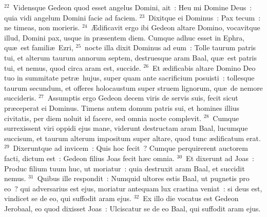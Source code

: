 ${}^{22}$~Vidensque Gedeon quod esset angelus Domini, ait~: Heu mi Domine Deus~: quia vidi angelum Domini facie ad faciem.
${}^{23}$~Dixitque ei Dominus~: Pax tecum~: ne timeas, non morieris.
${}^{24}$~\AE dificavit ergo ibi Gedeon altare Domino, vocavitque illud, Domini pax, usque in pr\ae sentem diem. Cumque adhuc esset in Ephra, qu\ae\ est famili\ae\ Ezri,
${}^{25}$~nocte illa dixit Dominus ad eum~: Tolle taurum patris tui, et alterum taurum annorum septem, destruesque aram Baal, qu\ae\ est patris tui, et nemus, quod circa aram est, succide.
${}^{26}$~Et \ae dificabis altare Domino Deo tuo in summitate petr\ae\ hujus, super quam ante sacrificium posuisti~: tollesque taurum secundum, et offeres holocaustum super struem lignorum, qu\ae\ de nemore succideris.
${}^{27}$~Assumptis ergo Gedeon decem viris de servis suis, fecit sicut pr\ae ceperat ei Dominus. Timens autem domum patris sui, et homines illius civitatis, per diem noluit id facere, sed omnia nocte complevit.
${}^{28}$~Cumque surrexissent viri oppidi ejus mane, viderunt destructam aram Baal, lucumque succisum, et taurum alterum impositum super altare, quod tunc \ae dificatum erat.
${}^{29}$~Dixeruntque ad invicem~: Quis hoc fecit~? Cumque perquirerent auctorem facti, dictum est~: Gedeon filius Joas fecit h\ae c omnia.
${}^{30}$~Et dixerunt ad Joas~: Produc filium tuum huc, ut moriatur~: quia destruxit aram Baal, et succidit nemus.
${}^{31}$~Quibus ille respondit~: Numquid ultores estis Baal, ut pugnetis pro eo~? qui adversarius est ejus, moriatur antequam lux crastina veniat~: si deus est, vindicet se de eo, qui suffodit aram ejus.
${}^{32}$~Ex illo die vocatus est Gedeon Jerobaal, eo quod dixisset Joas~: Ulciscatur se de eo Baal, qui suffodit aram ejus.



